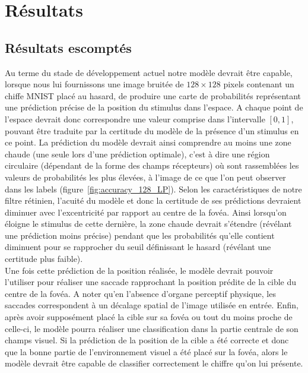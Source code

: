 
\chapter{Résultats} %
 
\label{Résultats} %


\section{Résultats escomptés}
\label{result_escompt}

Au terme du stade de développement actuel notre modèle devrait être capable, lorsque nous lui fournissons une image bruitée de $128\times 128$ pixels contenant un chiffe MNIST placé au hasard, de produire une carte de probabilités représentant une prédiction précise de la position du stimulus dans l'espace.
A chaque point de l'espace devrait donc correspondre une valeur comprise dans l'intervalle $[0,1]$, pouvant être traduite par la certitude du modèle de la présence d'un stimulus en ce point.
La prédiction du modèle devrait ainsi comprendre au moins une zone chaude (une seule lors d'une prédiction optimale), c'est à dire une région circulaire (dépendant de la forme des champs récepteurs) où sont rassemblées les valeurs de probabilités les plus élevées, à l'image de ce que l'on peut observer dans les labels (figure~\ref{fig:accuracy_128_LP}).
Selon les caractéristiques de notre filtre rétinien, l'acuité du modèle et donc la certitude de ses prédictions devraient diminuer avec l'excentricité par rapport au centre de la fovéa.
Ainsi lorsqu'on éloigne le stimulus de cette dernière, la zone chaude devrait s'étendre (révélant une prédiction moins précise) pendant que les probabilités qu'elle contient diminuent pour se rapprocher du seuil définissant le hasard (révélant une certitude plus faible). \autocite{Freeman2011, Werner2014} \\
Une fois cette prédiction de la position réalisée, le modèle devrait pouvoir l'utiliser pour réaliser une saccade rapprochant la position prédite de la cible du centre de la fovéa.
A noter qu'en l'absence d'organe perceptif physique, les saccades correspondent à un décalage spatial de l'image utilisée en entrée.
Enfin, après avoir supposément placé la cible sur sa fovéa ou tout du moins proche de celle-ci, le modèle pourra réaliser une classification dans la partie centrale de son champs visuel.
Si la prédiction de la position de la cible a été correcte et donc que la bonne partie de l'environnement visuel a été placé sur la fovéa, alors le modèle devrait être capable de classifier correctement le chiffre qu'on lui présente. \autocite{Werner2014}

